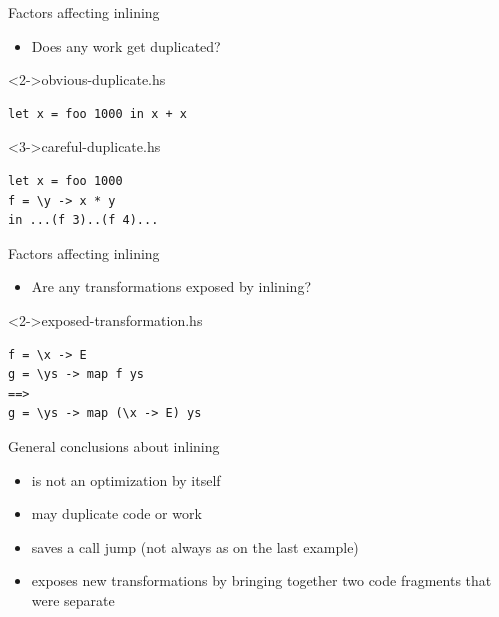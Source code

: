 \documentclass[hyperref={pdfpagelabels=false},xcolor={dvipsnames},compress,table,usenames,dvipsnames]{beamer}
\begin{document}
    \begin{frame}[fragile]{Factors affecting inlining}
        \begin{itemize}
            \item Does any work get duplicated?
        \end{itemize}
        \begin{exampleblock}
            <2->{obvious-duplicate.hs}
            \begin{lstlisting}
let x = foo 1000 in x + x
            \end{lstlisting}
        \end{exampleblock}
        \begin{exampleblock}
            <3->{careful-duplicate.hs}
            \begin{lstlisting}
let x = foo 1000
f = \y -> x * y
in ...(f 3)..(f 4)...
            \end{lstlisting}
        \end{exampleblock}
    \end{frame}

    \begin{frame}[fragile]{Factors affecting inlining}
        \begin{itemize}
            \item Are any transformations exposed by inlining?
        \end{itemize}
        \begin{exampleblock}
            <2->{exposed-transformation.hs}
            \begin{lstlisting}
f = \x -> E
g = \ys -> map f ys
==>
g = \ys -> map (\x -> E) ys
            \end{lstlisting}
        \end{exampleblock}
    \end{frame}

    \begin{frame}[fragile]{General conclusions about inlining}
        \begin{itemize}
            \item is not an optimization by itself\pause
            \item may duplicate code or work\pause
            \item saves a call jump (not always as on the last example)\pause
            \item exposes new transformations by bringing together two code fragments that were separate
        \end{itemize}
    \end{frame}
\end{document}
